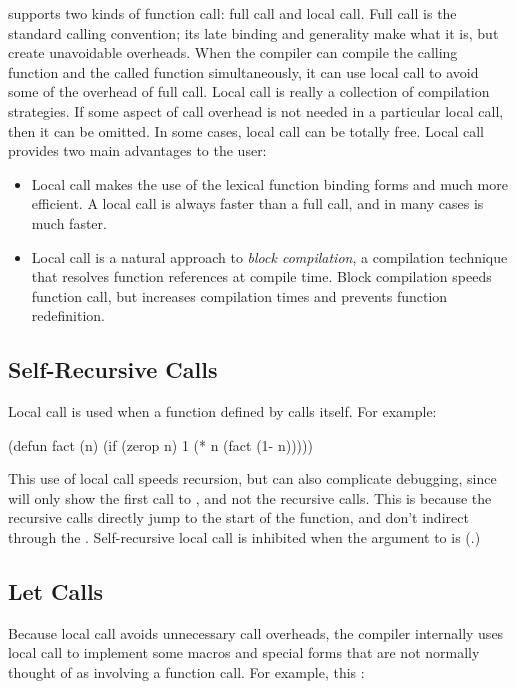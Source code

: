 \python{} supports two kinds of function call: full call and local call.
Full call is the standard calling convention; its late binding and
generality make \llisp{} what it is, but create unavoidable overheads.
When the compiler can compile the calling function and the called
function simultaneously, it can use local call to avoid some of the
overhead of full call.  Local call is really a collection of
compilation strategies.  If some aspect of call overhead is not needed
in a particular local call, then it can be omitted.  In some cases,
local call can be totally free.  Local call provides two main
advantages to the user:
\begin{itemize}
  
\item Local call makes the use of the lexical function binding forms
   and  much more efficient.  A local
  call is always faster than a full call, and in many cases is much
  faster.
  
\item Local call is a natural approach to \textit{block compilation}, a
  compilation technique that resolves function references at compile
  time.  Block compilation speeds function call, but increases
  compilation times and prevents function redefinition.
\end{itemize}



\subsection{Self-Recursive Calls}

Local call is used when a function defined by  calls itself.  For
example:
\begin{lisp}
(defun fact (n)
  (if (zerop n)
      1
      (* n (fact (1- n)))))
\end{lisp}

This use of local call speeds recursion, but can also complicate
debugging, since  will only show the first call to
, and not the recursive calls.  This is because the
recursive calls directly jump to the start of the function, and don't
indirect through the .  Self-recursive local
call is inhibited when the  argument to
 is \false{} (.)


\subsection{Let Calls}
\label{let-calls}
Because local call avoids unnecessary call overheads, the compiler
internally uses local call to implement some macros and special forms
that are not normally thought of as involving a function call.  For
example, this :

